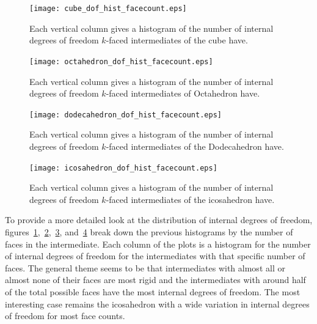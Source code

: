 \begin{figure}[ht]
\centering
  \texttt{[image: cube\_dof\_hist\_facecount.eps]}
\caption{Each vertical column gives a histogram of the number of internal degrees of freedom $k$-faced intermediates of the cube have.}
\label{fig:CubeDoFHistFC}
\end{figure}

\begin{figure}[ht]
\centering
  \texttt{[image: octahedron\_dof\_hist\_facecount.eps]}
\caption{Each vertical column gives a histogram of the number of internal degrees of freedom $k$-faced intermediates of Octahedron have.}
\label{fig:OctaDoFHistFC}
\end{figure}

\begin{figure}[ht]
\centering
  \texttt{[image: dodecahedron\_dof\_hist\_facecount.eps]}
\caption{Each vertical column gives a histogram of the number of internal degrees of freedom $k$-faced intermediates of the Dodecahedron have.}
\label{fig:DodecDoFHistFC}
\end{figure}

\begin{figure}[ht]
\centering
\texttt{[image: icosahedron\_dof\_hist\_facecount.eps]}
\caption{Each vertical column gives a histogram of the number of internal degrees of freedom $k$-faced intermediates of the icosahedron have.}
\label{fig:IcosaDoFHistFC}
\end{figure}

To provide a more detailed look at the distribution of internal degrees of freedom, figures~\ref{fig:CubeDoFHistFC},~\ref{fig:OctaDoFHistFC},~\ref{fig:DodecDoFHistFC}, and~\ref{fig:IcosaDoFHistFC} break down the previous histograms by the number of faces in the intermediate. Each column of the plots is a histogram for the number of internal degrees of freedom for the intermediates with that specific number of faces. The general theme seems to be that intermediates with almost all or almost none of their faces are most rigid and the intermediates with around half of the total possible faces have the most internal degrees of freedom. The most interesting case remains the icosahedron with a wide variation in internal degrees of freedom for most face counts.

